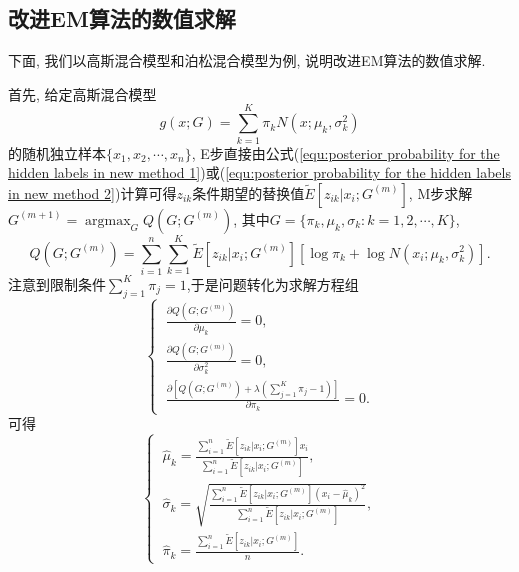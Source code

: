 \documentclass[a4paper,12pt,openany,oneside,utf-8]{ctexbook}
\begin{document}
\subsection{改进EM算法的数值求解}
下面, 我们以高斯混合模型和泊松混合模型为例, 说明改进EM算法的数值求解.

首先, 给定高斯混合模型
\begin{equation*}
\label{equ:gaussian mixture model}
  g(x; G)=\sum_{k=1}^{K} \pi_{k} N(x;\mu_{k},\sigma_{k}^2)
\end{equation*}
的随机独立样本$\{x_1, x_2, \cdots, x_n\}$, E步直接由公式(\ref{equ:posterior probability for the hidden labels in new method 1})或(\ref{equ:posterior probability for the hidden labels in new method 2})计算可得$z_{ik}$条件期望的替换值$\tilde{E}[z_{ik}|x_i;G^{(m)}]$, M步求解$G^{(m+1)}=\mathop{\arg\max}_{G} Q(G;G^{(m)})$, 其中$G=\{\pi_{k},\mu_{k},\sigma_{k}: k=1, 2, \cdots, K\}$,
\begin{equation}
\label{equ:Q function in gaussian mixture model}
  Q(G;G^{(m)})=\sum_{i=1}^{n} \sum_{k=1}^{K} \tilde{E}[z_{ik}|x_i;G^{(m)}] [ \log\pi_{k} + \log N(x_{i}; \mu_{k},\sigma_{k}^2) ].
\end{equation}
注意到限制条件$\sum_{j=1}^{K} \pi_j =1$,于是问题转化为求解方程组
\[
\begin{cases}
 \ \frac{\partial Q(G;G^{(m)})}{\partial \mu_{k}} =0, \\
 \ \frac{\partial Q(G;G^{(m)})}{\partial \sigma_{k}^2} =0, \\
 \ \frac{\partial [Q(G;G^{(m)})+\lambda(\sum_{j=1}^{K}\pi_j-1)]}{\partial \pi_{k}} =0.
\end{cases}
\]
可得
\[
\begin{cases}
 \ \hat{\mu}_{k} = \frac{\sum_{i=1}^{n} \tilde{E}[z_{ik}|x_i;G^{(m)}] x_i}{\sum_{i=1}^{n} \tilde{E}[z_{ik}|x_i;G^{(m)}]}, \\
 \ \hat{\sigma}_{k} = \sqrt{
                            \frac{\sum_{i=1}^{n} \tilde{E}[z_{ik}|x_i;G^{(m)}] (x_i-\hat{\mu}_{k})^2}{\sum_{i=1}^{n} \tilde{E}[z_{ik}|x_i;G^{(m)}]}
                           }, \\
 \ \hat{\pi}_{k} = \frac{\sum_{i=1}^{n} \tilde{E}[z_{ik}|x_i;G^{(m)}]}{n}.
\end{cases}
\]
\end{document}
